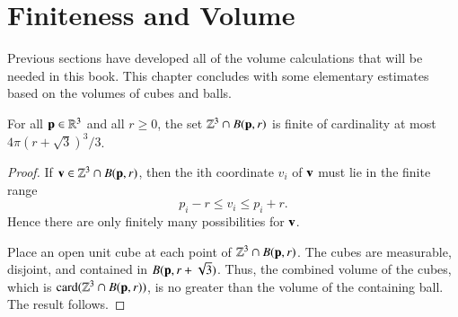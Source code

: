 %


\section{Finiteness and Volume}

Previous sections have developed all of the volume calculations that will
be needed in this book.  This chapter concludes with some 
elementary estimates based on the volumes of  cubes and balls.

\begin{lemma}[]
\label{lemma:Zcount}
For all ${\mathbf p}\in\mathbb{R}^3$ and all $r\ge 0$, the set
$\mathbb{Z}^3\cap B({\mathbf p},r)$ is finite of cardinality at most
$4\pi (r+\sqrt3)^3/3$.
%
\end{lemma}

\begin{proof}  If ${\mathbf v}\in\mathbb{Z}^3\cap B({\mathbf p},r)$, then the ith
coordinate $v_i$ of ${\mathbf v}$ must lie in the finite range
\begin{displaymath}
p_i - r \le v_i \le p_i + r.
\end{displaymath}
Hence there are only finitely many possibilities for ${\mathbf v}$.


Place an open unit cube at each point of $\mathbb{Z}^3\cap B({\mathbf p},r)$.
The cubes are measurable, disjoint, and contained in
$B({\mathbf p},r+\sqrt3)$.  Thus, the combined volume of the cubes, which is
${\operatorname{card}}(\mathbb{Z}^3\cap B({\mathbf p},r))$,  is no greater than the volume of the
containing ball.  The result follows.
\end{proof}


